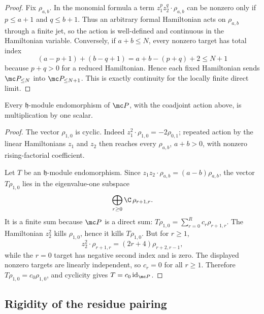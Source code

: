\begin{proof}
  Fix \(\rho_{a,b}\).  In the monomial formula a term
  \(z_1^p z_2^q\cdot\rho_{a,b}\) can be nonzero only if
  \(p\leq a+1\) and \(q\leq b+1\).  Thus an arbitrary formal Hamiltonian
  acts on \(\rho_{a,b}\) through a finite jet, so the action is
  well-defined and continuous in the Hamiltonian variable.  Conversely,
  if \(a+b\leq N\), every nonzero target has total index
  \[
    (a-p+1)+(b-q+1)=a+b-(p+q)+2\leq N+1
  \]
  because \(p+q>0\) for a reduced Hamiltonian.  Hence each fixed
  Hamiltonian sends \(\mc P_{\leq N}\) into \(\mc P_{\leq N+1}\).  This is
  exactly continuity for the locally finite direct limit.
\end{proof}

\begin{lem}
\label{lem:app-matlis-coadjoint-centralizer}
  Every \(\mathfrak h\)-module endomorphism of \(\mc P\), with the
  coadjoint action above, is multiplication by one scalar.
\end{lem}

\begin{proof}
  The vector \(\rho_{1,0}\) is cyclic.  Indeed
  \(z_1^2\cdot\rho_{1,0}=-2\rho_{0,1}\); repeated action by the linear
  Hamiltonians \(z_1\) and \(z_2\) then reaches every
  \(\rho_{a,b}\), \(a+b>0\), with nonzero rising-factorial coefficient.

  Let \(T\) be an \(\mathfrak h\)-module endomorphism.  Since
  \(z_1z_2\cdot\rho_{a,b}=(a-b)\rho_{a,b}\), the vector
  \(T\rho_{1,0}\) lies in the eigenvalue-one subspace
  \[
    \bigoplus_{r\geq0}\C\,\rho_{r+1,r}.
  \]
  It is a finite sum because \(\mc P\) is a direct sum:
  \(T\rho_{1,0}=\sum_{r=0}^R c_r\rho_{r+1,r}\).  The Hamiltonian
  \(z_2^2\) kills \(\rho_{1,0}\), hence it kills \(T\rho_{1,0}\).  But
  for \(r\geq1\),
  \[
    z_2^2\cdot\rho_{r+1,r}
      =(2r+4)\rho_{r+2,r-1},
  \]
  while the \(r=0\) target has negative second index and is zero.  The
  displayed nonzero targets are linearly independent, so \(c_r=0\) for
  all \(r\geq1\).  Therefore \(T\rho_{1,0}=c_0\rho_{1,0}\), and cyclicity
  gives \(T=c_0\,\mathrm{id}_{\mc P}\).
\end{proof}

\subsection{Rigidity of the residue pairing}
\label{ssec:app-matlis-rigidity}


